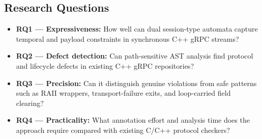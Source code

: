 \documentclass[11pt,a4paper]{article}
\begin{document}
\subsection{Research Questions}
\begin{itemize}
    \item \textbf{RQ1 --- Expressiveness:} How well can dual session-type automata capture temporal and payload constraints in synchronous C++ gRPC streams?
    \item \textbf{RQ2 --- Defect detection:} Can path-sensitive AST analysis find protocol and lifecycle defects in existing C++ gRPC repositories?
    \item \textbf{RQ3 --- Precision:} Can it distinguish genuine violations from safe patterns such as RAII wrappers, transport-failure exits, and loop-carried field clearing?
    \item \textbf{RQ4 --- Practicality:} What annotation effort and analysis time does the approach require compared with existing C/C++ protocol checkers?
\end{itemize}



\end{document}
